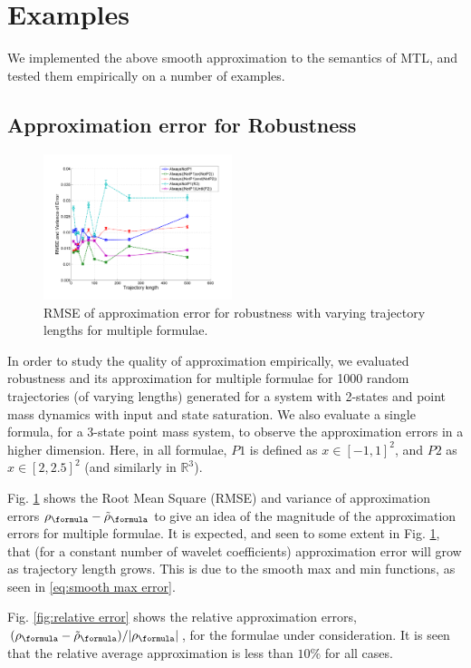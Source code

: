 \section{Examples}
\label{sec:examples}
We implemented the above smooth approximation to the semantics of MTL, and tested them empirically on a number of examples.

\subsection{Approximation error for Robustness}
\label{sec: ex apx error}
\begin{figure}[t]
\centering
\includegraphics[width=0.49\textwidth]{figures/RobustnessError}
\caption{RMSE of approximation error for robustness with varying trajectory lengths for multiple formulae.}
\label{fig:sample result}
\end{figure}

In order to study the quality of approximation empirically, we evaluated robustness and its approximation for multiple formulae for 1000 random trajectories (of varying lengths) generated for a system with 2-states and point mass dynamics with input and state saturation. We also evaluate a single formula, for a 3-state point mass system, to observe the approximation errors in a higher dimension. Here, in all formulae, $P1$ is defined as $x \in [-1,1]^2$, and $P2$ as $x\in [2,2.5]^2$ (and similarly in $\mathbb{R}^3$).

Fig. \ref{fig:sample result} shows the Root Mean Square (RMSE) and variance of approximation errors $\robf-\srobf$ to give an idea of the magnitude of the approximation errors for multiple formulae. 
It is expected, and seen to some extent in Fig. \ref{fig:sample result}, that (for a constant number of wavelet coefficients) approximation error will grow as trajectory length grows. This is due to the smooth max and min functions, as seen in \eqref{eq:smooth max error}.

Fig. \ref{fig:relative error} shows the relative approximation errors, $(\robf-\srobf)/|\robf|$, for the formulae under consideration. It is seen that the relative average approximation is less than $10\%$ for all cases. 

